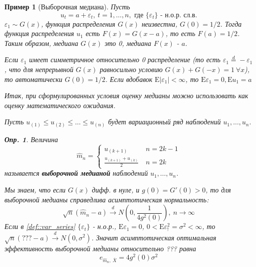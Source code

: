 \documentclass[12pt]{article}
\newtheorem{definition}{Опр.}
\newtheorem*{example}{Пример}
\theoremstyle{basic_theorem}
\theoremstyle{name_theorem}
\newcommand\defin[1]{\textbf{#1}}
\def\eps{ \varepsilon }
\def\E{ \mathrm{E} }
\begin{document}
    \begin{example}[Выборочная медиана]
        Пусть
        \begin{equation} \label{def::var_series}
            u_t=a+\eps_t,\ t=1,\ldots,n,\text{ где }\{\eps_t\}\text{ - н.о.р. сл.в.}
        \end{equation} 
        $\eps_1\sim G(x)$, функция распределения $G(x)$ неизвестна,
        $G(0)=1/2$. Тогда функция распределения $u_1$ есть $F(x)=G(x-a)$,
        то есть $F(a)=1/2$. Таким образом, медиана $G(x)$ это 0, медиана $F(x)$ - $a$.
        \begin{leftbar}
            Если $\eps_1$ имеет симметричное относительно 0 распределение
            (то есть $\eps_1\overset{d}{=}-\eps_1$, что для непрерывной
            $G(x)$ равносильно условию $G(x)+G(-x)=1\ \forall x$), то
            автоматически $G(0)=1/2$. Если вдобавок $\E\lvert\eps_1\rvert<\infty$,
            то $\E\eps_1=0,\E u_1=a$
        \end{leftbar}
        Итак, при сформулированных условия оценку медианы можно использовать
        как оценку математического ожидания.

        Пусть $u_{(1)}\leq u_{(2)}\leq\ldots\leq u_{(n)}$ будет вариационный
        ряд наблюдений $u_1,\ldots,u_n$.
        \begin{definition}
            Величина
            \[
                \widehat{m}_n=\begin{cases}
                    u_{(k+1)}\ &n=2k-1 \\
                    \frac{u_{(k+1)} + u_{(k)}}{2}\ &n=2k
                \end{cases}
            \]
            называется \defin{выборочной медианой} наблюдений $u_1,\ldots,u_n$.
        \end{definition}

        Мы знаем, что если $G(x)$ дифф. в нуле, и $g(0) = G'(0)>0$,
        то для выборочной медианы справедлива асимптотическая нормальность:
        \[ \sqrt{n}(\widehat{m}_n - a)\xrightarrow{d}N(0, \frac{1}{4g^2(0)}),\ n\rightarrow\infty\]
        Если в \eqref{def::var_series} $\{\eps_t\}$ - н.о.р., $\E\eps_1=0$,
        $0<\E\eps_!^2=\sigma^2<\infty$, то $\sqrt{n}(???-a)\xrightarrow{d}N(0,\sigma^2)$.
        Значит асимптотическая оптимальная эффективность выборочной медианы относительно ???
        равна
        \[\boxed{e_{\widehat{m}_n,\ \overline{X}}=4g^2(0)\sigma^2}\]


\end{example}
\end{document}
